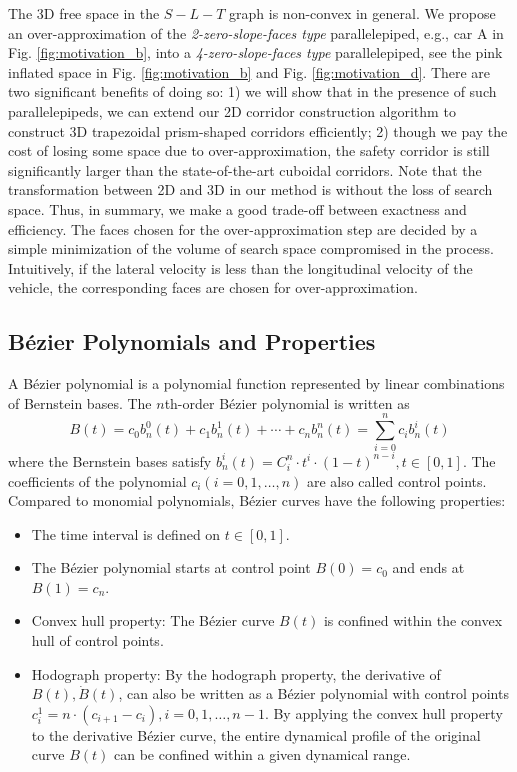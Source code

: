 \documentclass[journal,a4paper,onecolumn,12pt]{IEEEtran}
\begin{document}
The 3D free space in the $S-L-T$ graph is non-convex in general. We propose an over-approximation of the \emph{2-zero-slope-faces type} parallelepiped, e.g., car A in Fig. \ref{fig:motivation_b}, into a \emph{4-zero-slope-faces type} parallelepiped, see the pink inflated space in Fig. \ref{fig:motivation_b} and Fig. \ref{fig:motivation_d}. There are two significant benefits of doing so: 1) we will show that in the presence of such parallelepipeds, we can extend our 2D corridor construction algorithm \cite{li_motion_nodate} to construct 3D trapezoidal prism-shaped corridors efficiently; 2) though we pay the cost of losing some space due to over-approximation, the safety corridor is still significantly larger than the state-of-the-art cuboidal corridors. Note that the transformation between 2D and 3D in our method is without the loss of search space. Thus, in summary, we make a good trade-off between exactness and efficiency. The faces chosen for the over-approximation step are decided by a simple minimization of the volume of search space compromised in the process. Intuitively, if the lateral velocity is less than the longitudinal velocity of the vehicle, the corresponding faces are chosen for over-approximation.

\subsection{B\'{e}zier Polynomials and Properties}

A B\'{e}zier polynomial is a polynomial function represented by linear combinations of Bernstein bases. The $n$th-order B\'{e}zier polynomial is written as
$$
B(t)=c_{0} b_{n}^{0}(t)+c_{1} b_{n}^{1}(t)+\cdots+c_{n} b_{n}^{n}(t)=\sum_{i=0}^{n} c_{i} b_{n}^{i}(t)
$$
where the Bernstein bases satisfy $b_{n}^{i}(t)=C_{i}^{n} \cdot t^{i} \cdot(1-t)^{n-i}, t \in[0,1]$. The coefficients of the polynomial $c_{i}(i=0,1, \ldots, n)$ are also called control points. Compared to monomial polynomials, B\'{e}zier curves have the following properties:

\begin{itemize}
    \item The time interval is defined on $t \in[0,1]$.
    \item The B\'{e}zier polynomial starts at control point $B(0)=c_{0}$ and ends at $B(1)=c_{n}$.
    \item Convex hull property: The B\'{e}zier curve $B(t)$ is confined within the convex hull of control points.
    \item Hodograph property: By the hodograph property, the derivative of $B(t), \dot{B}(t)$, can also be written as a B\'{e}zier polynomial with control points $c_{i}^{1}=n \cdot\left(c_{i+1}-c_{i}\right), i=0,1, \ldots, n-1$. By applying the convex hull property to the derivative B\'{e}zier curve, the entire dynamical profile of the original curve $B(t)$ can be confined within a given dynamical range.
\end{itemize}
\end{document}
